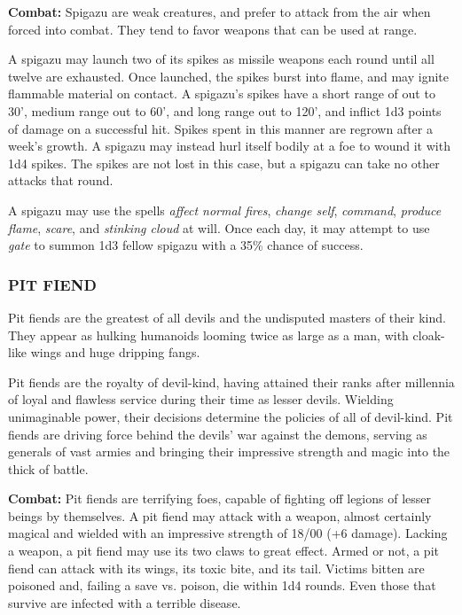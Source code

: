 \begin{multicols}{2}
\textbf{Combat:} Spigazu are weak creatures, and prefer to attack from the air when forced into combat. They tend to favor weapons that can be used at range.

A spigazu may launch two of its spikes as missile weapons each round until all twelve are exhausted. Once launched, the spikes burst into flame, and may ignite flammable material on contact. A spigazu's spikes have a short range of out to 30', medium range out to 60', and long range out to 120', and inflict 1d3 points of damage on a successful hit. Spikes spent in this manner are regrown after a week's growth. A spigazu may instead hurl itself bodily at a foe to wound it with 1d4 spikes. The spikes are not lost in this case, but a spigazu can take no other attacks that round.

A spigazu may use the spells \textit{affect normal fires}, \textit{change self}, \textit{command}, \textit{produce flame}, \textit{scare}, and \textit{stinking cloud} at will. Once each day, it may attempt to use \textit{gate} to summon 1d3 fellow spigazu with a 35\% chance of success.

\subsubsection{PIT FIEND}

Pit fiends are the greatest of all devils and the undisputed masters of their kind. They appear as hulking humanoids looming twice as large as a man, with cloak-like wings and huge dripping fangs.

Pit fiends are the royalty of devil-kind, having attained their ranks after millennia of loyal and flawless service during their time as lesser devils. Wielding unimaginable power, their decisions determine the policies of all of devil-kind. Pit fiends are driving force behind the devils' war against the demons, serving as generals of vast armies and bringing their impressive strength and magic into the thick of battle.

\textbf{Combat:} Pit fiends are terrifying foes, capable of fighting off legions of lesser beings by themselves. A pit fiend may attack with a weapon, almost certainly magical and wielded with an impressive strength of 18/00 (+6 damage). Lacking a weapon, a pit fiend may use its two claws to great effect. Armed or not, a pit fiend can attack with its wings, its toxic bite, and its tail. Victims bitten are poisoned and, failing a save vs. poison, die within 1d4 rounds. Even those that survive are infected with a terrible disease.


\end{multicols}
